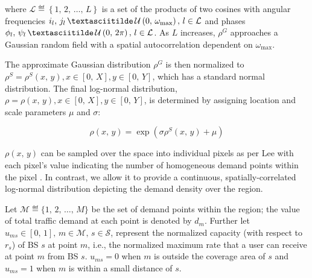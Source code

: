 \documentclass[onecolumn,draftcls]{IEEEtran}
\begin{document}
\noindent \sloppy where $\mathcal{L} \eqdef \left\{1,\, 2,\, \ldots,\, L\right\}$ is a set of the products of two cosines with angular frequencies $i_l,\, j_l\, \textasciitilde\, \mathcal{U}\left(0,\, \omega_{\max}\right),\, l \in \mathcal{L}$ and phases $\phi_l,\, \psi_l\, \textasciitilde\, \mathcal{U}\left(0,\, 2\pi\right),\, l \in \mathcal{L}$.  As $L$ increases, $\rho^G$ approaches a Gaussian random field with a spatial autocorrelation dependent on $\omega_{\max}$.

The approximate Gaussian distribution $\rho^G$ is then normalized to $\rho^S = \rho^S(x,\, y), x \in [0,\, X], y \in [0,\, Y]$, which has a standard normal distribution.  The final log-normal distribution, $\rho = \rho(x,\, y), x \in [0,\, X], y \in [0,\, Y]$, is determined by assigning location and scale parameters $\mu$ and $\sigma$:

\begin{equation}
\rho\left(x,\, y\right) = \exp\left(\sigma\rho^S\left(x,\, y\right)+\mu\right)
\end{equation}

$\rho\left(x,\, y\right)$ can be sampled over the space into individual pixels as per Lee with each pixel's value indicating the number of homogeneous demand points within the pixel \cite{6554749}.  In contrast, we allow it to provide a continuous, spatially-correlated log-normal distribution depicting the demand density over the region.

Let $\mathcal{M} \eqdef \{1,\, 2,\, \ldots,\, M\}$ be the set of demand points within the region; the value of total traffic demand at each point is denoted by $d_m$.  Further let $u_{ms} \in [0,\, 1],\, m \in \mathcal{M},\, s \in \mathcal{S}$, represent the normalized capacity (with respect to $r_s$) of BS $s$ at point $m$, i.e., the normalized maximum rate that a user can receive at point $m$ from BS $s$.  $u_{ms} = 0$ when $m$ is outside the coverage area of $s$ and $u_{ms} = 1$ when $m$ is within a small distance of $s$.%
\end{document}
